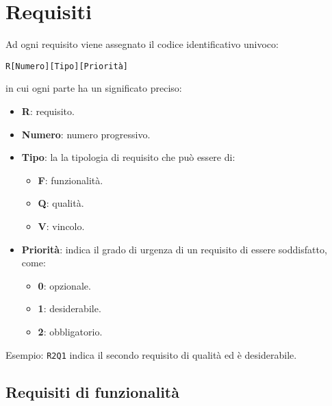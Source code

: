 \section{Requisiti}
Ad ogni requisito viene assegnato il codice identificativo univoco:
	\begin{center}
		\texttt{R[Numero][Tipo][Priorità]} 
	\end{center} 
	in cui ogni parte ha un significato preciso:
	\begin{itemize}
		\item \textbf{R}: requisito.
		\item \textbf{Numero}: numero progressivo.
		\item \textbf{Tipo}: la la tipologia di requisito che può essere di:
		\begin{itemize}
			\item \textbf{F}: funzionalità.
			\item \textbf{Q}: qualità.
			\item \textbf{V}: vincolo.
		\end{itemize}
		\item \textbf{Priorità}: indica il grado di urgenza di un requisito di essere soddisfatto, come:
		\begin{itemize}
			\item \textbf{0}: opzionale.
			\item \textbf{1}: desiderabile.
			\item \textbf{2}: obbligatorio.
		\end{itemize}
	\end{itemize}
	

	Esempio: \texttt{R2Q1} indica il secondo requisito di qualità ed è desiderabile.

	

\newcommand{\decrZ}{\addtocounter{vaZ}{+1}} %
\newcommand{\addNumber}[0]{\thevaZ \decrZ} %
\addtocounter{vaZ}{1}%

	\subsection{Requisiti di funzionalità}
	
